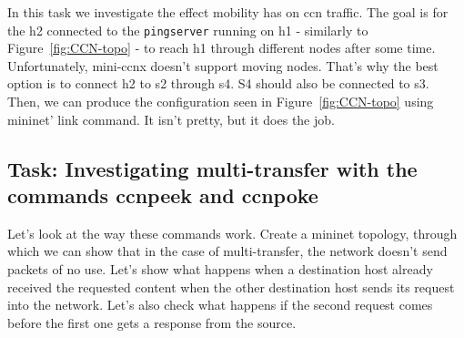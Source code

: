 \documentclass[a4paper]{article}
\begin{document}
In this task we investigate the effect mobility has on ccn traffic. The goal is for the h2 connected
to the \verb!pingserver! running on h1 - similarly to Figure~\ref{fig:CCN-topo} - to reach h1 through different nodes after
some time. Unfortunately, mini-ccnx doesn't support moving nodes. That's why the best option is to
connect h2 to s2 through s4. S4 should also be connected to s3. Then, we can produce the configuration
seen in Figure~\ref{fig:CCN-topo} using mininet' link command. It isn't pretty, but it does the job.

\subsection{Task: Investigating multi-transfer with the commands ccnpeek and ccnpoke}

Let's look at the way these commands work. Create a mininet topology, through which we can show that
in the case of multi-transfer, the network doesn't send packets of no use. Let's show what happens
when a destination host already received the requested content when the other destination host sends
its request into the network. Let's also check what happens if the second request comes before the
first one gets a response from the source.
\end{document}
